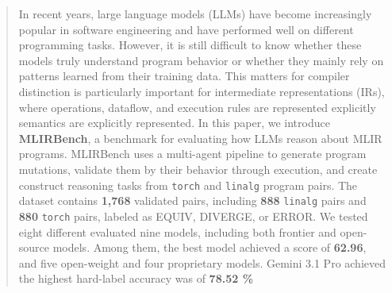 \documentclass[sigplan,screen,review,anonymous]{acmart}
\providecommand{\DIFadd}[1]{{\protect\color{blue} \sf #1}} %
\providecommand{\DIFdel}[1]{{\protect\color{red} \scriptsize #1}} %
\providecommand{\DIFaddbegin}{} %
\providecommand{\DIFaddend}{} %
\providecommand{\DIFdelbegin}{} %
\providecommand{\DIFdelend}{} %
\begin{document}
\begin{abstract}

In recent years, large language models (LLMs) have become increasingly popular in software engineering and have performed well on different programming tasks. However, it is still difficult to know whether these models truly understand program behavior or whether they mainly rely on patterns learned from their training data. This \DIFdelbegin \DIFdel{matters for compiler }\DIFdelend \DIFaddbegin \DIFadd{distinction is particularly important for }\DIFaddend intermediate representations (IRs), where operations, dataflow, and execution \DIFdelbegin \DIFdel{rules are represented explicitly }\DIFdelend \DIFaddbegin \DIFadd{semantics are explicitly represented}\DIFaddend . In this paper, we introduce \textbf{MLIRBench}, a benchmark for evaluating how LLMs reason about MLIR programs. MLIRBench uses a multi-agent pipeline to generate \DIFaddbegin \DIFadd{program }\DIFaddend mutations, validate \DIFdelbegin \DIFdel{them by }\DIFdelend \DIFaddbegin \DIFadd{their behavior through }\DIFaddend execution, and \DIFdelbegin \DIFdel{create }\DIFdelend \DIFaddbegin \DIFadd{construct }\DIFaddend reasoning tasks from \texttt{torch} and \texttt{linalg} program pairs. The dataset contains \textbf{1,768} validated pairs, including \textbf{888} \texttt{linalg} pairs and \textbf{880} \texttt{torch} pairs, labeled as \textsc{EQUIV}, \textsc{DIVERGE}, or \textsc{ERROR}. We \DIFdelbegin \DIFdel{tested eight different }\DIFdelend \DIFaddbegin \DIFadd{evaluated nine }\DIFaddend models, including \DIFdelbegin \DIFdel{both frontier and open-source models. Among them, the best model achieved a score of \textbf{62.96}, and }\DIFdelend \DIFaddbegin \DIFadd{five open-weight and four proprietary models. Gemini 3.1 Pro achieved }\DIFaddend the highest hard-label accuracy \DIFdelbegin \DIFdel{was }\DIFdelend \DIFaddbegin \DIFadd{of }\DIFaddend \textbf{\DIFdelbegin \DIFdel{78.52}\DIFdelend \DIFaddbegin \DIFadd{92.65}\DIFaddend \%\DIFdelbegin %
}
\end{abstract}
\end{document}
